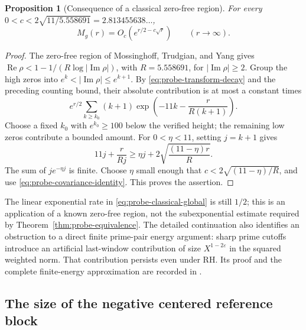 \documentclass[11pt]{article}
\numberwithin{equation}{section}
\newtheorem{proposition}[theorem]{Proposition}
\theoremstyle{definition}
\theoremstyle{remark}
\newcommand{\Rea}{\operatorname{Re}}
\newcommand{\Ima}{\operatorname{Im}}
\begin{document}
\begin{proposition}[Consequence of a classical zero-free region]
\label{prop:probe-classical-global}
For every \(0<c<2\sqrt{11/5.558691}=2.813455638\ldots\),
\begin{equation}\label{eq:probe-classical-global}
M_g(r)=O_c\!\left(e^{r/2-c\sqrt r}\right)
\qquad(r\to\infty).
\end{equation}
\end{proposition}
\begin{proof}
The zero-free region of Mossinghoff, Trudgian, and Yang
\cite[Theorem~1.3]{MTY} gives
\(\Rea\rho<1-1/(R\log|\Ima\rho|)\), with \(R=5.558691\),
for \(|\Ima\rho|\ge2\). Group the high zeros into
\(e^k<|\Ima\rho|\le e^{k+1}\). By
\eqref{eq:probe-transform-decay} and the preceding counting bound,
their absolute contribution is at most a constant times
\[
e^{r/2}\sum_{k\ge k_0}(k+1)
\exp\left(-11k-\frac{r}{R(k+1)}\right).
\]
Choose a fixed \(k_0\) with \(e^{k_0}\ge100\) below the verified
height; the remaining low zeros contribute a bounded amount. For
\(0<\eta<11\), setting \(j=k+1\) gives
\[
11j+\frac r{Rj}\ge\eta j+
2\sqrt{\frac{(11-\eta)r}{R}}.
\]
The sum of \(j e^{-\eta j}\) is finite. Choose \(\eta\) small enough
that \(c<2\sqrt{(11-\eta)/R}\), and use
\eqref{eq:probe-covariance-identity}. This proves the assertion.
\end{proof}

The linear exponential rate in \eqref{eq:probe-classical-global}
is still \(1/2\); this is an application of a known zero-free region,
not the subexponential estimate required by
Theorem~\ref{thm:probe-equivalence}. The detailed continuation also
identifies an obstruction to a direct finite prime-pair energy argument:
sharp prime cutoffs introduce an artificial last-window contribution
of size \(X^{1-2\varepsilon}\) in the squared weighted norm. That
contribution persists even under RH. Its proof and the complete
finite-energy approximation are recorded in \cite{GlobalGrowthNotes}.



\subsection{The size of the negative centered reference block}
\label{subsec:centered-negative-index}
\end{document}

